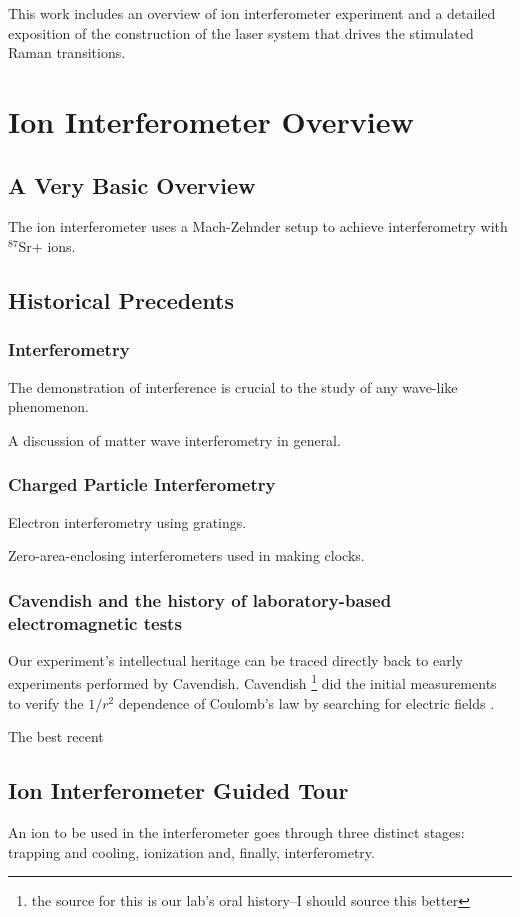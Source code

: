 This work includes an overview of ion interferometer experiment and a detailed exposition of the construction of the laser system that drives the stimulated Raman transitions.


\chapter{Ion Interferometer Overview}

\section{A Very Basic Overview}
The ion interferometer uses a Mach-Zehnder setup to achieve interferometry with $^{87}$Sr+ ions.
\section{Historical Precedents}
 \subsection{Interferometry}
  The demonstration of interference is crucial to the study of any wave-like phenomenon. 

  A discussion of matter wave interferometry in general. 
  \subsection{Charged Particle Interferometry}
  Electron interferometry using gratings. 

Zero-area-enclosing interferometers used in making clocks. 
\subsection{Cavendish and the history of laboratory-based electromagnetic tests}
  Our experiment's intellectual heritage can be traced directly back to early experiments performed by Cavendish. Cavendish \footnote{the source for this is our lab's oral history--I should source this better} did the initial measurements to verify the $1/r^2$ dependence of Coulomb's law by searching for electric fields \cite{jackson}. 

The best recent
\section{Ion Interferometer Guided Tour}
An ion to be used in the interferometer goes through three distinct stages: trapping and cooling, ionization and, finally, interferometry. 

